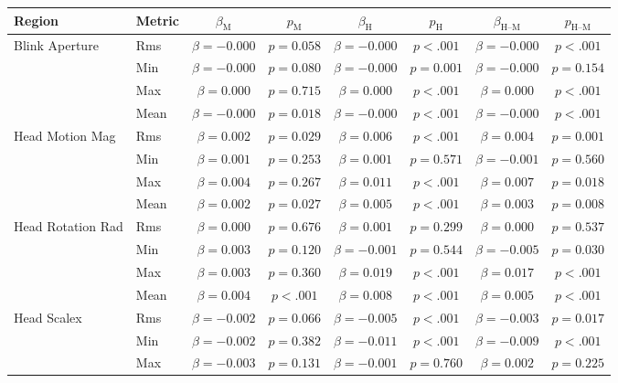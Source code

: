 \begin{tabular}{llcc|cc|cc}
\toprule
Region & Metric & $\beta_{\text{M}}$ & $p_{\text{M}}$ & $\beta_{\text{H}}$ & $p_{\text{H}}$ & $\beta_{\text{H--M}}$ & $p_{\text{H--M}}$ \\
\midrule
\multirow{4}{*}{Blink Aperture} & Rms & $\beta = -0.000$ & $p = 0.058$ & $\beta = -0.000$ & $p < .001$ & $\beta = -0.000$ & $p < .001$ \\
 & Min & $\beta = -0.000$ & $p = 0.080$ & $\beta = -0.000$ & $p = 0.001$ & $\beta = -0.000$ & $p = 0.154$ \\
 & Max & $\beta = 0.000$ & $p = 0.715$ & $\beta = 0.000$ & $p < .001$ & $\beta = 0.000$ & $p < .001$ \\
 & Mean & $\beta = -0.000$ & $p = 0.018$ & $\beta = -0.000$ & $p < .001$ & $\beta = -0.000$ & $p < .001$ \\
\midrule
\multirow{4}{*}{Head Motion Mag} & Rms & $\beta = 0.002$ & $p = 0.029$ & $\beta = 0.006$ & $p < .001$ & $\beta = 0.004$ & $p = 0.001$ \\
 & Min & $\beta = 0.001$ & $p = 0.253$ & $\beta = 0.001$ & $p = 0.571$ & $\beta = -0.001$ & $p = 0.560$ \\
 & Max & $\beta = 0.004$ & $p = 0.267$ & $\beta = 0.011$ & $p < .001$ & $\beta = 0.007$ & $p = 0.018$ \\
 & Mean & $\beta = 0.002$ & $p = 0.027$ & $\beta = 0.005$ & $p < .001$ & $\beta = 0.003$ & $p = 0.008$ \\
\midrule
\multirow{4}{*}{Head Rotation Rad} & Rms & $\beta = 0.000$ & $p = 0.676$ & $\beta = 0.001$ & $p = 0.299$ & $\beta = 0.000$ & $p = 0.537$ \\
 & Min & $\beta = 0.003$ & $p = 0.120$ & $\beta = -0.001$ & $p = 0.544$ & $\beta = -0.005$ & $p = 0.030$ \\
 & Max & $\beta = 0.003$ & $p = 0.360$ & $\beta = 0.019$ & $p < .001$ & $\beta = 0.017$ & $p < .001$ \\
 & Mean & $\beta = 0.004$ & $p < .001$ & $\beta = 0.008$ & $p < .001$ & $\beta = 0.005$ & $p < .001$ \\
\midrule
\multirow{4}{*}{Head Scalex} & Rms & $\beta = -0.002$ & $p = 0.066$ & $\beta = -0.005$ & $p < .001$ & $\beta = -0.003$ & $p = 0.017$ \\
 & Min & $\beta = -0.002$ & $p = 0.382$ & $\beta = -0.011$ & $p < .001$ & $\beta = -0.009$ & $p < .001$ \\
 & Max & $\beta = -0.003$ & $p = 0.131$ & $\beta = -0.001$ & $p = 0.760$ & $\beta = 0.002$ & $p = 0.225$ \\

\end{tabular}
